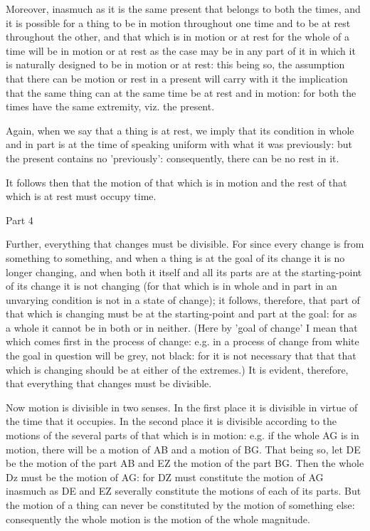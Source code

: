 Moreover, inasmuch as it is the same present that belongs to both
the times, and it is possible for a thing to be in motion throughout
one time and to be at rest throughout the other, and that which is
in motion or at rest for the whole of a time will be in motion or
at rest as the case may be in any part of it in which it is naturally
designed to be in motion or at rest: this being so, the assumption
that there can be motion or rest in a present will carry with it the
implication that the same thing can at the same time be at rest and
in motion: for both the times have the same extremity, viz. the present.

Again, when we say that a thing is at rest, we imply that its condition
in whole and in part is at the time of speaking uniform with what
it was previously: but the present contains no 'previously': consequently,
there can be no rest in it. 

It follows then that the motion of that which is in motion and the
rest of that which is at rest must occupy time. 

Part 4

Further, everything that changes must be divisible. For since every
change is from something to something, and when a thing is at the
goal of its change it is no longer changing, and when both it itself
and all its parts are at the starting-point of its change it is not
changing (for that which is in whole and in part in an unvarying condition
is not in a state of change); it follows, therefore, that part of
that which is changing must be at the starting-point and part at the
goal: for as a whole it cannot be in both or in neither. (Here by
'goal of change' I mean that which comes first in the process of change:
e.g. in a process of change from white the goal in question will be
grey, not black: for it is not necessary that that that which is changing
should be at either of the extremes.) It is evident, therefore, that
everything that changes must be divisible. 

Now motion is divisible in two senses. In the first place it is divisible
in virtue of the time that it occupies. In the second place it is
divisible according to the motions of the several parts of that which
is in motion: e.g. if the whole AG is in motion, there will be a motion
of AB and a motion of BG. That being so, let DE be the motion of the
part AB and EZ the motion of the part BG. Then the whole Dz must be
the motion of AG: for DZ must constitute the motion of AG inasmuch
as DE and EZ severally constitute the motions of each of its parts.
But the motion of a thing can never be constituted by the motion of
something else: consequently the whole motion is the motion of the
whole magnitude. 

